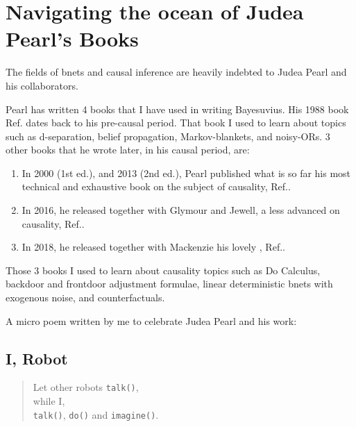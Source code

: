 \chapter{Navigating 
the ocean of Judea Pearl's Books}

\label{ch-nav-pearl}

The fields of bnets and causal inference are
heavily indebted to Judea Pearl and his
collaborators.

Pearl has written
4 books that I have used
in writing Bayesuvius.
His 
1988 book Ref.\cite{pearl-1988book}
dates back to his pre-causal period.
That book I used to learn
about topics such as
d-separation, belief propagation,
Markov-blankets, and noisy-ORs.
3 other books that  he  wrote later,
in his causal period, 
are:
\begin{enumerate}
\item
In 2000 (1st ed.), and 2013 (2nd ed.),
Pearl published what
is so far
his most technical
and exhaustive book
on the subject of causality,
Ref.\cite{pearl-2013book}.
\item
In 2016,
he released 
together
with Glymour and Jewell,
a less advanced 
on causality, Ref.\cite{pearl-primer}.
\item
In 2018, 
he released 
together with
Mackenzie his
lovely  ,
 Ref.\cite{book-why}.
\end{enumerate}
Those 3 books I used to learn
about causality topics
such as Do Calculus,
backdoor and frontdoor
adjustment formulae,
linear 
deterministic 
bnets with exogenous noise,
and counterfactuals.

A micro poem written by me
to celebrate Judea Pearl and 
his work:
 
\section*{I, Robot}
\begin{verse}
Let other robots {\tt talk()},\\
while I,\\
{\tt talk()}, {\tt do()} and {\tt imagine()}.
\end{verse}
